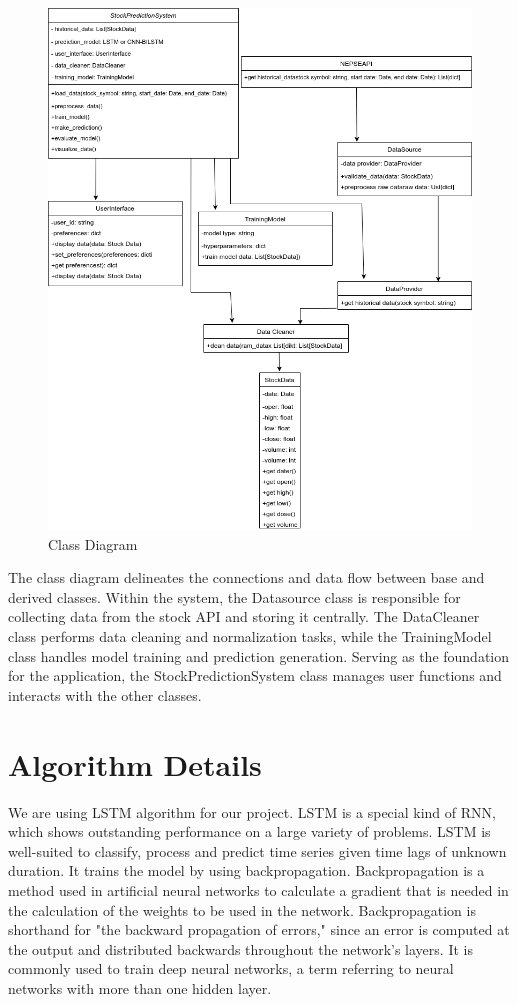 \documentclass[./main.tex]{subfiles}
\begin{document}
\begin{figure}[H]
    \centering
    \includegraphics[width=1\linewidth]{images/ClassDiagram (1).png}
    \caption{Class Diagram}
    \label{fig:4.4}
\end{figure}
 \noindent 
The class diagram delineates the connections and data flow between base and derived classes. Within the system, the Datasource class is responsible for collecting data from the stock API and storing it centrally. The DataCleaner class performs data cleaning and normalization tasks, while the TrainingModel class handles model training and prediction generation. Serving as the foundation for the application, the StockPredictionSystem class manages user functions and interacts with the other classes.
\section{Algorithm Details}
We are using LSTM algorithm for our project. LSTM is a special kind of RNN, which shows outstanding performance on a large variety of problems. LSTM is well-suited to classify, process and predict time series given time lags of unknown duration. It trains the model by using backpropagation. Backpropagation is a method used in artificial neural networks to calculate a gradient that is needed in the calculation of the weights to be used in the network. Backpropagation is shorthand for "the backward propagation of errors," since an error is computed at the output and distributed backwards throughout the network's layers. It is commonly used to train deep neural networks, a term referring to neural networks with more than one hidden layer. \cite{intellipaat-lstm}
\end{document}
